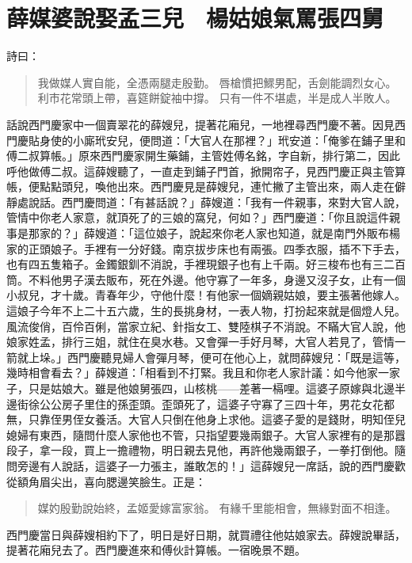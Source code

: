 
\chapter{薛媒婆說娶孟三兒　楊姑娘氣罵張四舅}

詩曰：
\begin{quote}
我做媒人實自能，全憑兩腿走殷勤。
唇槍慣把鰥男配，舌劍能調烈女心。
利市花常頭上帶，喜筵餅錠袖中撐。
只有一件不堪處，半是成人半敗人。
\end{quote}

話說西門慶家中一個賣翠花的薛嫂兒，提著花廂兒，一地裡尋西門慶不著。因見西門慶貼身使的小廝玳安兒，便問道：「大官人在那裡？」玳安道：「俺爹在鋪子里和傅二叔算帳。」原來西門慶家開生藥鋪，主管姓傅名銘，字自新，排行第二，因此呼他做傅二叔。這薛嫂聽了，一直走到鋪子門首，掀開帘子，見西門慶正與主管算帳，便點點頭兒，喚他出來。西門慶見是薛嫂兒，連忙撇了主管出來，兩人走在僻靜處說話。西門慶問道：「有甚話說？」薛嫂道：「我有一件親事，來對大官人說，管情中你老人家意，就頂死了的三娘的窩兒，何如？」西門慶道：「你且說這件親事是那家的？」薛嫂道：「這位娘子，說起來你老人家也知道，就是南門外販布楊家的正頭娘子。手裡有一分好錢。南京拔步床也有兩張。四季衣服，插不下手去，也有四五隻箱子。金鐲銀釧不消說，手裡現銀子也有上千兩。好三梭布也有三二百筒。不料他男子漢去販布，死在外邊。他守寡了一年多，身邊又沒子女，止有一個小叔兒，才十歲。青春年少，守他什麼！有他家一個嫡親姑娘，要主張著他嫁人。這娘子今年不上二十五六歲，生的長挑身材，一表人物，打扮起來就是個燈人兒。風流俊俏，百伶百俐，當家立紀、針指女工、雙陸棋子不消說。不瞞大官人說，他娘家姓孟，排行三姐，就住在臭水巷。又會彈一手好月琴，大官人若見了，管情一箭就上垛。」西門慶聽見婦人會彈月琴，便可在他心上，就問薛嫂兒：「既是這等，幾時相會看去？」薛嫂道：「相看到不打緊。我且和你老人家計議：如今他家一家子，只是姑娘大。雖是他娘舅張四，山核桃——差著一槅哩。這婆子原嫁與北邊半邊街徐公公房子里住的孫歪頭。歪頭死了，這婆子守寡了三四十年，男花女花都無，只靠侄男侄女養活。大官人只倒在他身上求他。這婆子愛的是錢財，明知侄兒媳婦有東西，隨問什麼人家他也不管，只指望要幾兩銀子。大官人家裡有的是那囂段子，拿一段，買上一擔禮物，明日親去見他，再許他幾兩銀子，一拳打倒他。隨問旁邊有人說話，這婆子一力張主，誰敢怎的！」這薛嫂兒一席話，說的西門慶歡從額角眉尖出，喜向腮邊笑臉生。正是：
\begin{quote}
媒妁殷勤說始終，孟姬愛嫁富家翁。
有緣千里能相會，無緣對面不相逢。
\end{quote}

西門慶當日與薛嫂相約下了，明日是好日期，就買禮往他姑娘家去。薛嫂說畢話，提著花廂兒去了。西門慶進來和傅伙計算帳。一宿晚景不題。

